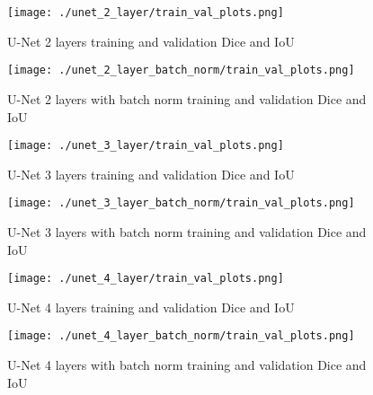 \documentclass{article}
\begin{document}
\begin{figure}[h]
    \centering
    \texttt{[image: ./unet\_2\_layer/train\_val\_plots.png]}
    \caption{U-Net 2 layers training and validation Dice and IoU}
    \label{fig:unet_2_layer}
\end{figure}

\begin{figure}[h]
    \centering
    \texttt{[image: ./unet\_2\_layer\_batch\_norm/train\_val\_plots.png]}
    \caption{U-Net 2 layers with batch norm training and validation Dice and IoU}
    \label{fig:unet_2_layer_batch_norm}
\end{figure}

\begin{figure}[h]
    \centering
    \texttt{[image: ./unet\_3\_layer/train\_val\_plots.png]}
    \caption{U-Net 3 layers training and validation Dice and IoU}
    \label{fig:unet_3_layer}
\end{figure}

\begin{figure}[h]
    \centering
    \texttt{[image: ./unet\_3\_layer\_batch\_norm/train\_val\_plots.png]}
    \caption{U-Net 3 layers with batch norm training and validation Dice and IoU}
    \label{fig:unet_3_layer_batch_norm}
\end{figure}

\begin{figure}[h]
    \centering
    \texttt{[image: ./unet\_4\_layer/train\_val\_plots.png]}
    \caption{U-Net 4 layers training and validation Dice and IoU}
    \label{fig:unet_4_layer}
\end{figure}

\begin{figure}[h]
    \centering
    \texttt{[image: ./unet\_4\_layer\_batch\_norm/train\_val\_plots.png]}
    \caption{U-Net 4 layers with batch norm training and validation Dice and IoU}
    \label{fig:unet_4_layer_batch_norm}
\end{figure}
\end{document}
